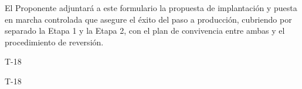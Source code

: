 
  {El Proponente adjuntará a este formulario la propuesta de implantación y puesta en marcha controlada que asegure el éxito del paso a producción, cubriendo por separado la Etapa 1 y la Etapa 2, con el plan de convivencia entre ambas y el procedimiento de reversión.}

\expandafter\def\csname esqueleto@T-18\endcsname{%
  \begin{formulario}{T-18}
    \begin{contenidoExigido}{T-18}
    \end{contenidoExigido}
  \end{formulario}}
